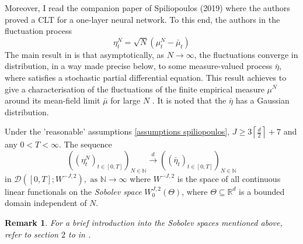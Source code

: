 \documentclass{article}
\theoremstyle{mystyle}
\newtheorem*{remark}{Remark}
\newcommand{\N}{\ensuremath{\mathbb{N}}}
\newcommand{\R}{\ensuremath{\mathbb{R}}}
\begin{document}
Moreover, I read the companion paper of Spiliopoulos (2019) \cite{sirignano2019meanfieldanalysisclt} where the authors proved a CLT for a one-layer neural network. To this end, the authors in \cite{sirignano2019meanfieldanalysisclt} the fluctuation process 
\begin{equation}
	\eta^{N}_t = \sqrt{N}(\mu^{N}_{t}-\bar{\mu}_{t})
\end{equation}
The main result in \cite{sirignano2019meanfieldanalysisclt} is that asymptotically, as $ N\to \infty$, the fluctuations converge in distribution, in a way made precise below, to some measure-valued process $ \bar{\eta}$, where satisfies a stochastic partial differential equation. This result achieves to give a characterisation of the fluctuations of the finite empirical measure $ \mu^{N}$ around its mean-field limit $ \bar{\mu}$ for large $ N$ . It is noted that the $ \bar{\eta}$
has a Gaussian distribution.

\begin{theorem}\label{thm: spiliopoulos CLT}
	Under the 'reasonable' assumptions \ref{assumptions spiliopoulos}, $J \geq 3\left \lceil \frac{d}{2}\right\rceil+7$ and any $ 0<T<\infty$. The sequence
	\begin{equation} 
		((\eta^{N}_{t})_{t\in [0,T]})_{N\in \N}\stackrel{d}{\to} ((\bar{\eta}_{t})_{t\in [0,T]})_{N\in \N}
	\end{equation}
	in $\mathcal{D}([0,T];W^{-J,2}), \text{ as } \N\to \infty$ where $ W^{-J,2}$ is the space of all continuous linear functionals on the \textit{Sobolev space} $ W^{J,2}_{0}(\Theta)$, where $ \Theta\subseteq\R^{d}$ is a bounded domain independent of $ N$.
\end{theorem}

\begin{remark}
	For a brief introduction into the Sobolev spaces mentioned above, refer to section $ 2$ to in \cite{sirignano2019meanfieldanalysisclt}.
\end{remark}
\end{document}
